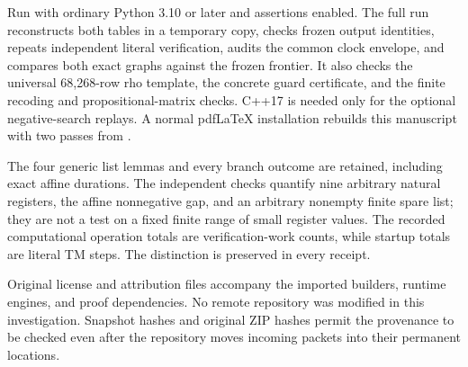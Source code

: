 \documentclass[11pt,letterpaper]{article}
\newcommand{\file}[1]{\path{#1}}
\begin{document}
Run \file{python3 verify_all.py} with ordinary Python 3.10 or
later and assertions enabled. The full run reconstructs both tables in a
temporary copy, checks frozen output identities, repeats independent
literal verification, audits the common clock envelope, and compares
both exact graphs against the frozen frontier. It also checks the
universal 68,268-row rho template, the concrete guard certificate, and
the finite recoding and propositional-matrix checks. C++17 is needed only for
the optional negative-search replays. A normal pdf\LaTeX{} installation
rebuilds this manuscript with two passes from \file{report/}.

The four generic list lemmas and every branch outcome are retained,
including exact affine durations. The independent checks quantify nine
arbitrary natural registers, the affine nonnegative gap, and an arbitrary
nonempty finite spare list; they are not a test on a fixed finite range
of small register values. The recorded computational operation totals
are verification-work counts, while startup totals are literal TM steps.
The distinction is preserved in every receipt.

Original license and attribution files accompany the imported builders,
runtime engines, and proof dependencies. No remote repository was
modified in this investigation. Snapshot hashes and original ZIP hashes
permit the provenance to be checked even after the repository moves
incoming packets into their permanent locations.
\end{document}
